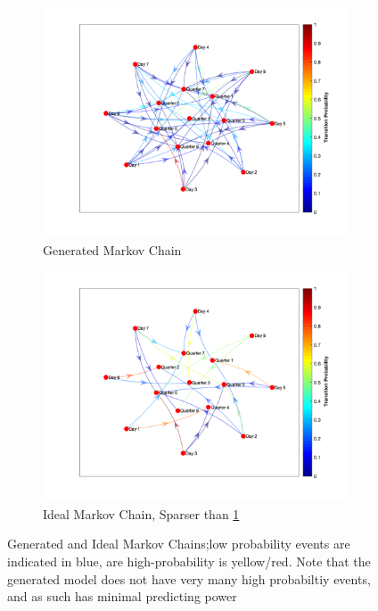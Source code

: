 \documentclass{article}
\begin{document}
\begin{figure}[ht]
\centering
\begin{subfigure}{.5\textwidth}
  \centering
  \includegraphics[width=\linewidth]{markov_model.png}
  \caption{Generated Markov Chain}
  \label{markov:a}
\end{subfigure}%
\begin{subfigure}{.5\textwidth}
  \centering
  \includegraphics[width=\linewidth]{ideal.png}
  \caption{Ideal Markov Chain, Sparser than \ref{markov:a}}
  \label{markov:b}
\end{subfigure}
\caption{Generated and Ideal Markov Chains;low probability events are indicated in blue, are high-probability is yellow/red. Note that the generated model does not have very many high probabiltiy events, and as such has minimal predicting power}
\label{markov}
\end{figure}
\end{document}
